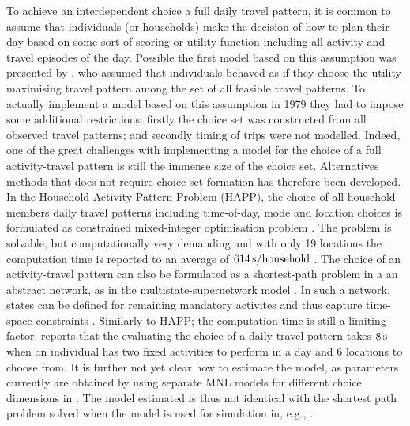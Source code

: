 To achieve an interdependent choice a full daily travel pattern, it is common to assume that individuals (or households) make the decision of how to plan their day based on some sort of scoring or utility function including all activity and travel episodes of the day. Possible the first model based on this assumption was presented by \citet{Adler79}, who assumed that individuals behaved as if they choose the utility maximising travel pattern among the set of all feasible travel patterns.
To actually implement a model based on this assumption in 1979 they had to impose some additional restrictions: firstly the choice set was constructed from all observed travel patterns; and secondly timing of trips were not modelled. Indeed, one of the great challenges with implementing a model for the choice of a full activity-travel pattern is still the immense size of the choice set. Alternatives methods that does not require choice set formation has therefore been developed. In the Household Activity Pattern Problem (HAPP), the choice of all household members daily travel patterns including time-of-day, mode and location choices is formulated as constrained mixed-integer optimisation problem \citep{Recker01,Recker08,Recker13,yuan2014HAPP}. The problem is solvable, but computationally very demanding and with only 19 locations the computation time is reported to an average of $614\, \mathrm{s/household}$ \citep{Recker13}. The choice of an activity-travel pattern can also be formulated as a shortest-path problem in a an abstract network, as in the multistate-supernetwork model \citep{arentze04Multistate}. In such a network, states can be defined for remaining mandatory activites and thus capture time-space constraints \citep{liao2013incorporating} \citep{liao2016modeling}. Similarly to HAPP; the computation time is still a limiting factor. \citet{liao2016modeling} reports that the evaluating the choice of a daily travel pattern takes $8\, \mathrm{s}$ when an individual has two fixed activities to perform in a day and 6 locations to choose from. It is further not yet clear how to estimate the model, as parameters currently are obtained by using separate MNL models for different choice dimensions in \citet{Liao2017}. The model estimated is thus not identical with the shortest path problem solved when the model is used for simulation in, e.g., \citet{liao2016modeling}.

